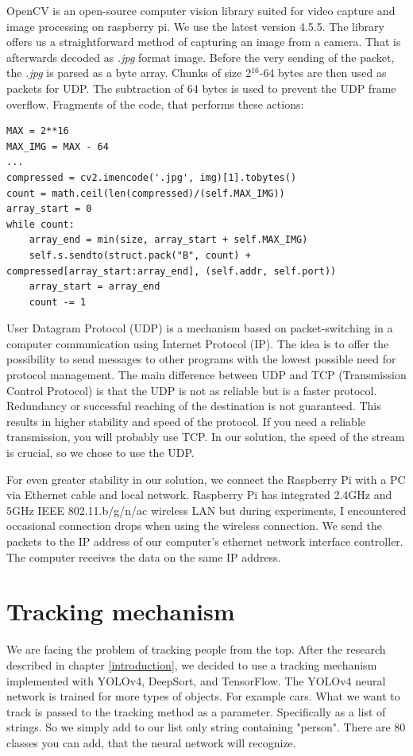 \documentclass{ctuthesis}
\begin{document}
OpenCV is an open-source computer vision library suited for video capture and image processing on raspberry pi\cite{3}. We use the latest version 4.5.5. The library offers us a straightforward method of capturing an image from a camera. That is afterwards decoded as \textit{.jpg} format image. Before the very sending of the packet, the \textit{.jpg} is parsed as a byte array. Chunks of size 2$^{16}$-64 bytes are then used as packets for UDP. The subtraction of 64 bytes is used to prevent the UDP frame overflow. Fragments of the code, that performs these actions:

\begin{lstlisting}
MAX = 2**16
MAX_IMG = MAX - 64
...
compressed = cv2.imencode('.jpg', img)[1].tobytes()
count = math.ceil(len(compressed)/(self.MAX_IMG))
array_start = 0
while count:
    array_end = min(size, array_start + self.MAX_IMG)
    self.s.sendto(struct.pack("B", count) + compressed[array_start:array_end], (self.addr, self.port))
    array_start = array_end
    count -= 1
\end{lstlisting}

User Datagram Protocol (UDP)  is a mechanism based on packet-switching in a computer communication using Internet Protocol (IP)\cite{4}. The idea is to offer the possibility to send messages to other programs with the lowest possible need for protocol management. The main difference between UDP and TCP (Transmission Control Protocol) is that the UDP is not as reliable but is a faster protocol. Redundancy or successful reaching of the destination is not guaranteed. This results in higher stability and speed of the protocol. If you need a reliable transmission, you will probably use TCP\cite{5}. In our solution, the speed of the stream is crucial, so we chose to use the UDP. 

For even greater stability in our solution, we connect the Raspberry Pi with a PC via Ethernet cable and local network. Raspberry Pi has integrated 2.4GHz and 5GHz IEEE 802.11.b/g/n/ac wireless LAN \cite{1} but during experiments, I encountered occasional connection drops when using the wireless connection. We send the packets to the IP address of our computer's ethernet network interface controller. The computer receives the data on the same IP address.

\section{Tracking mechanism}
We are facing the problem of tracking people from the top. After the research described in chapter  \ref{introduction}, we decided to use a tracking mechanism implemented with YOLOv4, DeepSort, and TensorFlow. The YOLOv4 neural network is trained for more types of objects. For example cars. What we want to track is passed to the tracking method as a parameter. Specifically as a list of strings. So we simply add to our list only string containing "person". There are 80 classes you can add, that the neural network will recognize.
\end{document}
